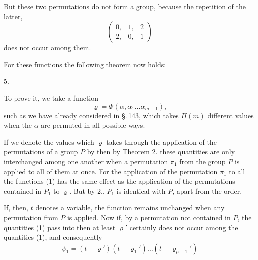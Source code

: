 
But these two permutations do not form a group, because the repetition of the latter,
\[
\begin{pmatrix} 0, & 1, & 2 \\ 2, & 0, & 1 \end{pmatrix}
\]
does not occur among them.

For these functions the following theorem now holds:

5. 

To prove it, we take a function
\[
\varrho = \Phi(\alpha, \alpha_1 \dots \alpha_{m-1}),
\]
such as we have already considered in \S.\,143, which takes $\Pi(m)$ different values when the $\alpha$ are permuted in all possible ways.

If we denote the values which $\varrho$ takes through the application of the permutations of a group $P$ by
then by Theorem 2. these quantities are only interchanged among one another when a permutation $\pi_1$ from the group $P$ is applied to all of them at once. For the application of the permutation $\pi_1$ to all the functions (1) has the same effect as the application of the permutations contained in $P_1$ to $\varrho$. But by 2., $P_1$ is identical with $P$, apart from the order.

If, then, $t$ denotes a variable, the function
remains unchanged when any permutation from $P$ is applied. Now if, by a permutation not contained in $P$, the quantities (1) pass into
then at least $\varrho'$ certainly does not occur among the quantities (1), and consequently
\[
\psi_1 = (t - \varrho')(t - \varrho_1') \dots (t - \varrho_{\mu-1}')
\]
